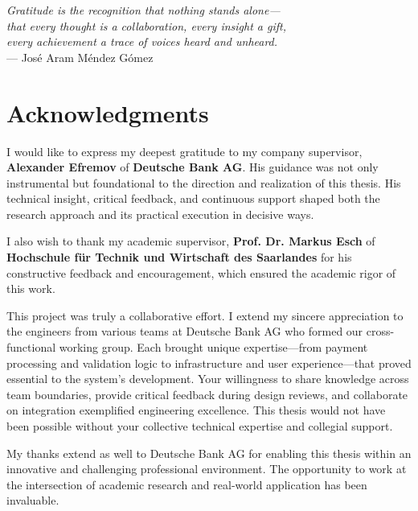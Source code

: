 
\begin{flushright}{\slshape    
    Gratitude is the recognition that nothing stands alone— \\
    that every thought is a collaboration, every insight a gift, \\
    every achievement a trace of voices heard and unheard.} \\ \medskip
    --- José Aram Méndez Gómez
\end{flushright}

\bigskip

\begingroup
\let\clearpage\relax
\let\cleardoublepage\relax
\chapter*{Acknowledgments}

I would like to express my deepest gratitude to my company supervisor, 
\textbf{Alexander Efremov} of \textbf{Deutsche Bank AG}. His guidance was 
not only instrumental but foundational to the direction and realization of 
this thesis. His technical insight, critical feedback, and continuous support 
shaped both the research approach and its practical execution in decisive ways.

I also wish to thank my academic supervisor, \textbf{Prof. Dr. Markus Esch} 
of \textbf{Hochschule für Technik und Wirtschaft des Saarlandes} for his constructive 
feedback and encouragement, which ensured the academic rigor of this work.

This project was truly a collaborative effort. I extend my sincere appreciation 
to the engineers from various teams at Deutsche Bank AG who formed our 
cross-functional working group. Each brought unique expertise—from payment 
processing and validation logic to infrastructure and user experience—that 
proved essential to the system's development. Your willingness to share 
knowledge across team boundaries, provide critical feedback during design 
reviews, and collaborate on integration exemplified engineering excellence. 
This thesis would not have been possible without your collective technical 
expertise and collegial support.

My thanks extend as well to Deutsche Bank AG for enabling this thesis 
within an innovative and challenging professional environment. The opportunity 
to work at the intersection of academic research and real-world application 
has been invaluable.

\endgroup